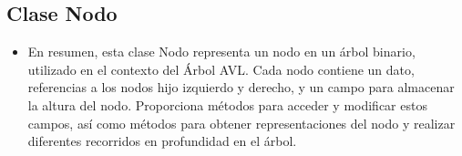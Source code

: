 \documentclass{article}
\begin{document}
	\subsection{Clase Nodo}
	\begin{itemize}	
		\item En resumen, esta clase Nodo representa un nodo en un árbol binario, utilizado en el contexto del Árbol AVL. Cada nodo contiene un dato, referencias a los nodos hijo izquierdo y derecho, y un campo para almacenar la altura del nodo. Proporciona métodos para acceder y modificar estos campos, así como métodos para obtener representaciones del nodo y realizar diferentes recorridos en profundidad en el árbol.
	\end{itemize}	
	
		
\end{document}
